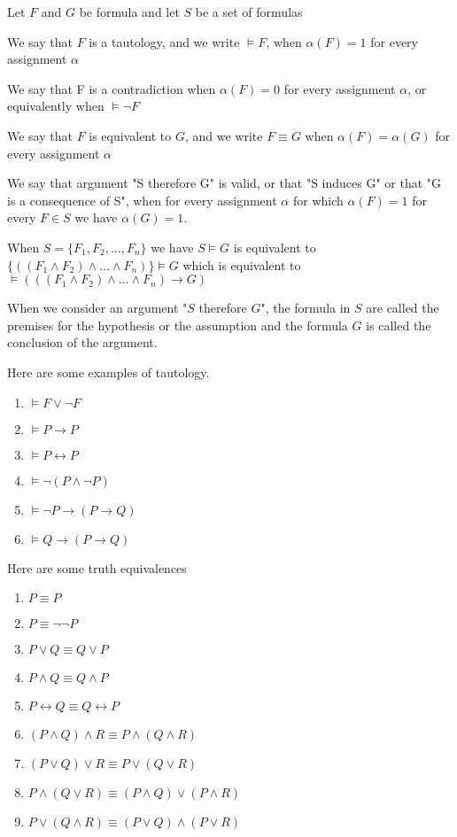 

Let $F$ and $G$ be formula and let $S$ be a set of formulas 

\begin{nota}
We say that $F$ is a tautology, and we write $\vDash F$, when $\alpha (F) =1$ for every assignment $\alpha$



We say that F is a contradiction when $\alpha (F) = 0$ for every assignment $\alpha$, or equivalently when $\vDash \neg F$

We say that $F$ is equivalent to $G$, and we write $F\equiv G$ when $\alpha (F) = \alpha (G)$ for every assignment $\alpha$

We say that argument "S therefore G" is valid, or that "S induces G" or that "G is a consequence of S", when for every assignment $\alpha$ for which $\alpha (F) = 1$ for every $F\in S$ we have $\alpha (G) = 1$. 

When $S = \{F_1, F_2,\dots ,F_n\}$ we have $S\vDash G$ is equivalent to $\{((F_1\wedge F_2)\wedge \dots \wedge F_n)\} \vDash G$ which is equivalent to $\vDash (((F_1\wedge F_2)\wedge \dots \wedge F_n)\to G)$
\end{nota}

When we consider an argument "$S$ therefore $G$", the formula in $S$ are called the premises for the hypothesis or the assumption and the formula $G$ is called the conclusion of the argument.

Here are some examples of tautology.

\begin{enumerate}
\item $\vDash F \vee \neg F$
\item $\vDash P \to P$
\item $\vDash P \leftrightarrow P$
\item $\vDash \neg (P\wedge \neg P)$
\item $\vDash \neg P \to (P \to Q)$
\item $\vDash Q\to (P\to Q)$
\end{enumerate}

Here are some truth equivalences

\begin{enumerate}
\item $P\equiv P$
\item $P\equiv \neg \neg P$
\item $P\vee Q \equiv Q \vee P$
\item $P\wedge Q \equiv Q\wedge P $
\item $P\leftrightarrow Q \equiv Q\leftrightarrow P$
\item $(P\wedge Q) \wedge R \equiv P\wedge (Q\wedge R)$
\item $(P\vee Q) \vee R \equiv P\vee (Q\vee R)$
\item $P\wedge (Q \vee R) \equiv (P\wedge Q)\vee (P \wedge R)$
\item $P\vee (Q \wedge R) \equiv (P\vee Q)\wedge (P \vee R)$
\end{enumerate}

